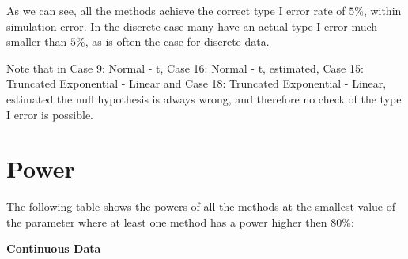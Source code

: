 \documentclass[]{svjour3}
\begin{document}
As we can see, all the methods achieve the correct type I error rate of
\(5\%\), within simulation error. In the discrete case many have an
actual type I error much smaller than \(5\%\), as is often the case for
discrete data.

Note that in Case 9: Normal - t, Case 16: Normal - t, estimated, Case
15: Truncated Exponential - Linear and Case 18: Truncated Exponential -
Linear, estimated the null hypothesis is always wrong, and therefore no
check of the type I error is possible.

\section{Power}

The following table shows the powers of all the methods at the smallest
value of the parameter where at least one method has a power higher then
\(80\%\):

\textbf{Continuous Data}
\end{document}

